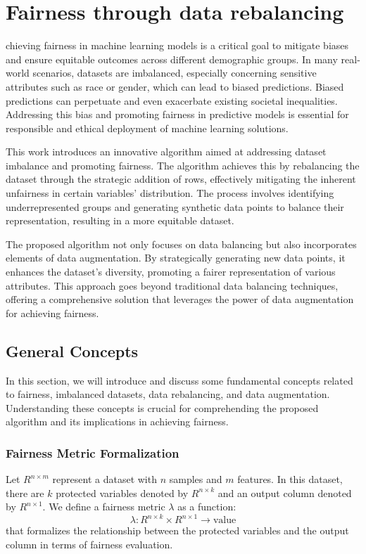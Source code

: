 \documentclass[12pt,a4paper,openright,twoside]{book}
\begin{document}
\section{Fairness through data rebalancing}
chieving fairness in machine learning models is a critical goal to mitigate biases and ensure equitable outcomes across different demographic groups. In many real-world scenarios, datasets are imbalanced, especially concerning sensitive attributes such as race or gender, which can lead to biased predictions. Biased predictions can perpetuate and even exacerbate existing societal inequalities. Addressing this bias and promoting fairness in predictive models is essential for responsible and ethical deployment of machine learning solutions.

This work introduces an innovative algorithm aimed at addressing dataset imbalance and promoting fairness. The algorithm achieves this by rebalancing the dataset through the strategic addition of rows, effectively mitigating the inherent unfairness in certain variables' distribution. The process involves identifying underrepresented groups and generating synthetic data points to balance their representation, resulting in a more equitable dataset.

The proposed algorithm not only focuses on data balancing but also incorporates elements of data augmentation. By strategically generating new data points, it enhances the dataset's diversity, promoting a fairer representation of various attributes. This approach goes beyond traditional data balancing techniques, offering a comprehensive solution that leverages the power of data augmentation for achieving fairness.

\subsection{General Concepts}
In this section, we will introduce and discuss some fundamental concepts related to fairness, imbalanced datasets, data rebalancing, and data augmentation. Understanding these concepts is crucial for comprehending the proposed algorithm and its implications in achieving fairness.

\subsubsection{Fairness Metric Formalization}
Let \( R^{n \times m} \) represent a dataset with \( n \) samples and \( m \) features. In this dataset, there are \( k \) protected variables denoted by \( R^{n \times k} \) and an output column denoted by \( R^{n \times 1} \). We define a fairness metric \( \lambda \) as a function:
\[ \lambda: R^{n \times k} \times R^{n \times 1} \rightarrow \text{value} \]
that formalizes the relationship between the protected variables and the output column in terms of fairness evaluation.
\end{document}

